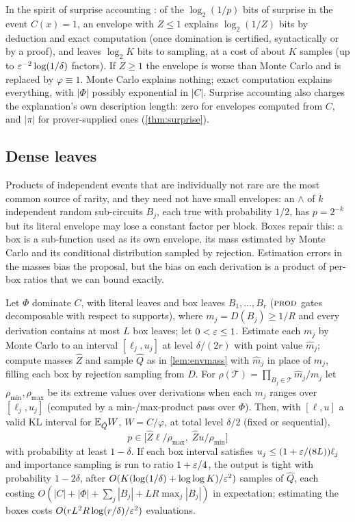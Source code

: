 In the spirit of surprise accounting \cite{hilton2024surprise}: of the $\log_2(1/p)$
bits of surprise in the event $C(x)=1$, an envelope with $Z\le1$ explains
$\log_2(1/Z)$ bits by deduction and exact computation (once domination is certified,
syntactically or by a proof), and leaves $\log_2K$ bits to sampling, at a cost of
about $K$ samples (up to $\varepsilon^{-2}\log(1/\delta)$ factors). If $Z\ge1$ the envelope is
worse than Monte Carlo and is replaced by $\varphi\equiv1$. Monte Carlo explains
nothing; exact computation explains everything, with $|\Phi|$ possibly exponential
in $|C|$. Surprise accounting also charges the explanation's own description length:
zero for envelopes computed from $C$, and $|\pi|$ for prover-supplied ones
(\cref{thm:surprise}).

\subsection{Dense leaves}\label{sec:boxes}

Products of independent events that are individually not rare are the most
common source of rarity, and they need not have small envelopes: an
$\wedge$ of $k$ independent random sub-circuits $B_j$, each true with
probability $1/2$, has $p=2^{-k}$ but its literal envelope may lose a constant
factor per block. Boxes repair this: a box is a sub-function used as its own
envelope, its mass estimated by Monte Carlo and its conditional distribution
sampled by rejection. Estimation errors in the masses bias the proposal, but
the bias on each derivation is a product of per-box ratios that we can bound
exactly.

\begin{theorem}\label{thm:boxes}
Let $\Phi$ dominate $C$, with literal leaves and box leaves $B_1,\dots,B_r$
($\textsc{prod}$ gates decomposable with respect to supports), where
$m_j=D(B_j)\ge1/R$ and every derivation contains at most $L$ box leaves; let
$0<\varepsilon\le1$. Estimate each $m_j$ by Monte Carlo to an interval $[\ell_j,u_j]$ at
level $\delta/(2r)$ with point value $\hat m_j$; compute masses $\hat Z$ and sample
$\hat Q$ as in \cref{lem:envmass} with $\hat m_j$ in place of $m_j$, filling each box
by rejection sampling from $D$. For $\rho(\mathcal T)=\prod_{B_j\in\mathcal
T}\hat m_j/m_j$ let $\rho_{\min},\rho_{\max}$ be its extreme values over derivations
when each $m_j$ ranges over $[\ell_j,u_j]$ (computed by a min-/max-product pass over
$\Phi$). Then, with $[\ell,u]$ a valid KL interval for $\mathbb{E}_{\hat Q}W$, $W=C/\varphi$, at
total level $\delta/2$ (fixed or sequential),
\[
p\in\big[\hat Z\ell/\rho_{\max},\;\hat Zu/\rho_{\min}\big]
\]
with probability at least $1-\delta$. If each box interval satisfies
$u_j\le(1+\varepsilon/(8L))\ell_j$ and importance sampling is run to ratio
$1+\varepsilon/4$, the output is tight with probability $1-2\delta$, after
$O(K(\log(1/\delta)+\log\log K)/\varepsilon^2)$ samples of $\hat Q$, each costing
$O(|C|+|\Phi|+\sum_j|B_j|+LR\max_j|B_j|)$ in expectation; estimating the boxes costs
$O(rL^2R\log(r/\delta)/\varepsilon^2)$ evaluations.
\end{theorem}

